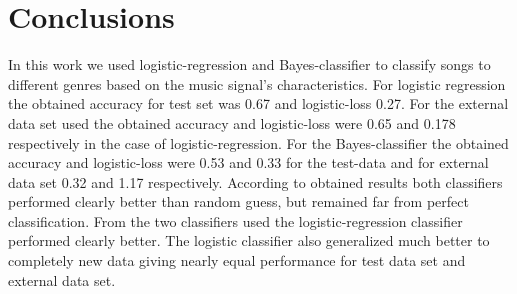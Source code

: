 \documentclass[aps,prb,10pt,twocolumn,groupedaddress]{revtex4-1}
\begin{document}
\section{Conclusions}
\label{sec:conclusions}
In this work we used logistic-regression and Bayes-classifier to classify songs
to different genres based on the music signal's characteristics. For logistic
regression the obtained accuracy for test set was 0.67 and logistic-loss 0.27.
For the external data set used the obtained accuracy and logistic-loss were 0.65
and 0.178 respectively in the case of logistic-regression. For the
Bayes-classifier the obtained accuracy and logistic-loss were 0.53 and 0.33 for
the test-data and for external data set 0.32 and 1.17 respectively. According to
obtained results both classifiers performed clearly better than random guess,
but remained far from perfect classification. From the two classifiers used
the logistic-regression classifier performed clearly better. The logistic
classifier also generalized much better to completely new data giving nearly
equal performance for test data set and external data set.


\end{document}
